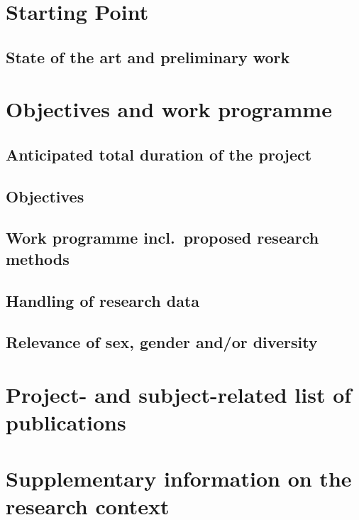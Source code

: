 \documentclass[english, 53.01]{proposal}
\begin{document}
\section{Starting Point}

\subsection*{State of the art and preliminary work}


\section{Objectives and work programme}

\subsection{Anticipated total duration of the project}

\subsection{Objectives}

\subsection{Work programme incl.\ proposed research methods}

\subsection{Handling of research data}

\subsection{Relevance of sex, gender and/or diversity}


\section{Project- and subject-related list of publications}

\printbibliography[heading=none]

\clearpage
\renewcommand{\maxpage}{8}
\setcounter{page}{1}

\section{Supplementary information on the research context}
\end{document}
